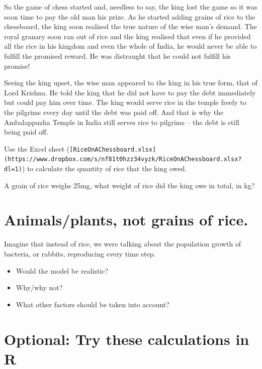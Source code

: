 \documentclass[
  a4paper]{book}
\providecommand{\tightlist}{%
  \setlength{\itemsep}{0pt}\setlength{\parskip}{0pt}}
\begin{document}
So the game of chess started and, needless to say, the king lost the game so it was soon time to pay the old man his prize. As he started adding grains of rice to the chessboard, the king soon realised the true nature of the wise man's demand. The royal granary soon ran out of rice and the king realised that even if he provided all the rice in his kingdom and even the whole of India, he would never be able to fulfill the promised reward. He was distraught that he could not fulfill his promise!

Seeing the king upset, the wise man appeared to the king in his true form, that of Lord Krishna. He told the king that he did not have to pay the debt immediately but could pay him over time. The king would serve rice in the temple freely to the pilgrims every day until the debt was paid off. And that is why the Ambalappuzha Temple in India still serves rice to pilgrims -- the debt is still being paid off.

\begin{do-something}
Use the Excel sheet
(\texttt{{[}RiceOnAChessboard.xlsx{]}(https://www.dropbox.com/s/nf81t0hzz34vyzk/RiceOnAChessboard.xlsx?dl=1)})
to calculate the quantity of rice that the king owed.

A grain of rice weighs 25mg, what weight of rice did the king owe in
total, in kg?
\end{do-something}

\hypertarget{animalsplants-not-grains-of-rice.}{%
\section{Animals/plants, not grains of rice.}\label{animalsplants-not-grains-of-rice.}}

Imagine that instead of rice, we were talking about the population growth of bacteria, or rabbits, reproducing every time step.

\begin{itemize}
\tightlist
\item
  Would the model be realistic?
\item
  Why/why not?
\item
  What other factors should be taken into account?
\end{itemize}

\hypertarget{optional-try-these-calculations-in-r}{%
\section{Optional: Try these calculations in R}\label{optional-try-these-calculations-in-r}}
\end{document}

